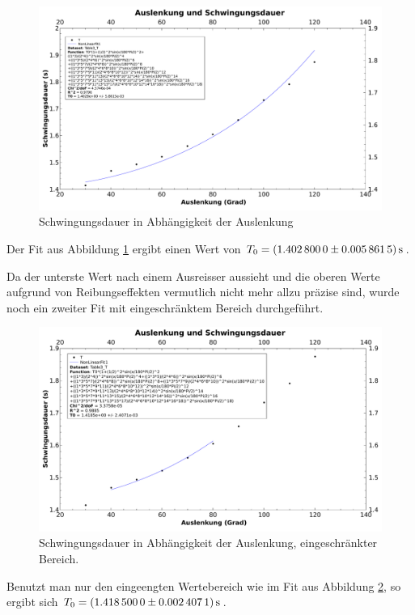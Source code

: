 \clearpage
\begin{figure}[h!]
    \centering
    \includegraphics[width=.875\textwidth]{images/313.pdf}
    \caption{%
        Schwingungsdauer in Abh\"angigkeit der Auslenkung
    }
    \label{fig:313a}
\end{figure}
\vspace*{-0.5em}

Der Fit aus Abbildung \ref{fig:313a} ergibt einen Wert von
$T_0  = \SI[separate-uncertainty = true]{1.4028 \pm 0.0058615}{\second}$.

Da der  unterste Wert  nach einem  Ausreisser aussieht  und die  oberen Werte
aufgrund  von Reibungseffekten  vermutlich  nicht mehr  allzu pr\"azise  sind,
wurde noch ein zweiter Fit mit eingeschr\"anktem Bereich durchgef\"uhrt.

\vspace*{-0.5em}
\begin{figure}[h!]
    \centering
    \includegraphics[width=.875\textwidth]{images/313b.pdf}
    \caption{%
        Schwingungsdauer in Abh\"angigkeit der Auslenkung, eingeschr\"ankter Bereich.
    }
    \label{fig:313b}
\end{figure}

\vspace*{-1em}
Benutzt man nur den eingeengten Wertebereich wie im Fit aus Abbildung \ref{fig:313b},
so ergibt sich
$T_0  = \SI[separate-uncertainty = true]{1.4185 \pm 0.0024071}{\second}$.

